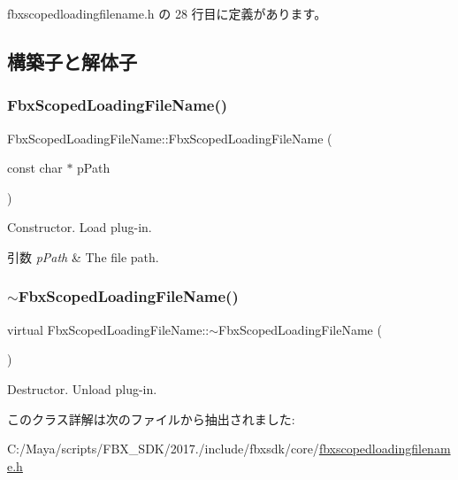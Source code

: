  fbxscopedloadingfilename.\+h の 28 行目に定義があります。



\subsection{構築子と解体子}
\mbox{\label{class_fbx_scoped_loading_file_name_a42319408c4e447d7b52965c5cc738a8e}} 
\subsubsection{\texorpdfstring{Fbx\+Scoped\+Loading\+File\+Name()}{FbxScopedLoadingFileName()}}
{\footnotesize\ttfamily Fbx\+Scoped\+Loading\+File\+Name\+::\+Fbx\+Scoped\+Loading\+File\+Name (\begin{DoxyParamCaption}\item[{const char $\ast$}]{p\+Path }\end{DoxyParamCaption})\hspace{0.3cm}{\ttfamily [explicit]}}

Constructor. Load plug-\/in. 
\begin{DoxyParams}{引数}
{\em p\+Path} & The file path. \\
\hline
\end{DoxyParams}
\mbox{\label{class_fbx_scoped_loading_file_name_a2f15050815bcb12cdd1b461e619374d6}} 
\subsubsection{\texorpdfstring{$\sim$\+Fbx\+Scoped\+Loading\+File\+Name()}{~FbxScopedLoadingFileName()}}
{\footnotesize\ttfamily virtual Fbx\+Scoped\+Loading\+File\+Name\+::$\sim$\+Fbx\+Scoped\+Loading\+File\+Name (\begin{DoxyParamCaption}{ }\end{DoxyParamCaption})\hspace{0.3cm}{\ttfamily [virtual]}}

Destructor. Unload plug-\/in. 

このクラス詳解は次のファイルから抽出されました\+:\begin{DoxyCompactItemize}
\item 
C\+:/\+Maya/scripts/\+F\+B\+X\+\_\+\+S\+D\+K/2017./include/fbxsdk/core/\hyperlink{fbxscopedloadingfilename_8h}{fbxscopedloadingfilename.\+h}\end{DoxyCompactItemize}
